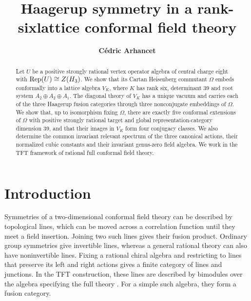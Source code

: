 \documentclass[leqno]{article}
\let\cal\relax
\newcommand{\cal}{\mathcal}
\DeclareMathOperator{\Rep}{Rep}
\numberwithin{equation}{section}
\begin{document}
\title{\bfseries{Haagerup symmetry in a rank-six\newline lattice conformal field theory}}
\date{}
\author{\bfseries{C\'edric Arhancet}}
\maketitle

\begin{abstract}
Let $U$ be a positive strongly rational vertex operator algebra of central charge eight with $\Rep(U) \cong Z(\cal H_3)$. We show that its Cartan Heisenberg commutant $\Omega$ embeds conformally into a lattice algebra $V_K$, where $K$ has rank six, determinant $39$ and root system $A_2\oplus A_2\oplus A_1$. The diagonal theory of $V_K$ has a unique vacuum and carries each of the three Haagerup fusion categories through three nonconjugate embeddings of $\Omega$. We show that, up to isomorphism fixing $\Omega$, there are exactly five conformal extensions of $\Omega$ with positive strongly rational target and global representation-category dimension $39$, and that their images in $V_K$ form four conjugacy classes. We also determine the common invariant relevant spectrum of the three canonical actions, their normalized cubic constants and their invariant genus-zero field algebra. We work in the TFT framework of rational full conformal field theory.
\end{abstract}

\makeatletter
\renewcommand{\@makefntext}[1]{#1}
\makeatother
{}

{
  \hypersetup{linkcolor=blue}
 \tableofcontents
}

\section{Introduction}
\label{sec:intro}

Symmetries of a two-dimensional conformal field theory can be described by topological lines, which can be moved across a correlation function until they meet a field insertion. Joining two such lines gives their fusion product. Ordinary group symmetries give invertible lines, whereas a general rational theory can also have noninvertible lines. Fixing a rational chiral algebra and restricting to lines that preserve its left and right actions gives a finite category of lines and junctions. In the TFT construction, these lines are described by bimodules over the algebra specifying the full theory \cite{FRS02,FFRS07}. For a simple such algebra, they form a fusion category.
\end{document}
